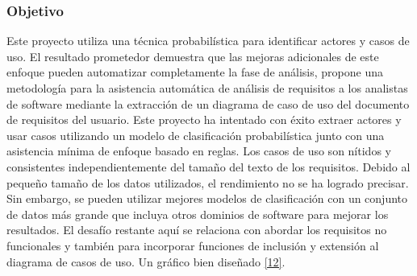 \subsubsection{Objetivo}
Este proyecto utiliza una técnica probabilística para identificar actores y casos de uso. El resultado prometedor demuestra que las mejoras adicionales de este enfoque pueden automatizar completamente la fase de análisis, propone una metodología para la asistencia automática de análisis de requisitos a los analistas de software mediante la extracción de un diagrama de caso de uso del documento de requisitos del usuario.
Este proyecto ha intentado con éxito extraer actores y usar casos utilizando un modelo de clasificación probabilística junto con una asistencia mínima de enfoque basado en reglas. Los casos de uso son nítidos y consistentes independientemente del tamaño del texto de los requisitos. Debido al pequeño tamaño de los datos utilizados, el rendimiento no se ha logrado precisar. Sin embargo, se pueden utilizar mejores modelos de clasificación con un conjunto de datos más grande que incluya otros dominios de software para mejorar los resultados. El desafío restante aquí se relaciona con abordar los requisitos no funcionales y también para incorporar funciones de inclusión y extensión al diagrama de casos de uso. Un gráfico bien diseñado \hyperlink{b12}{[12]}.